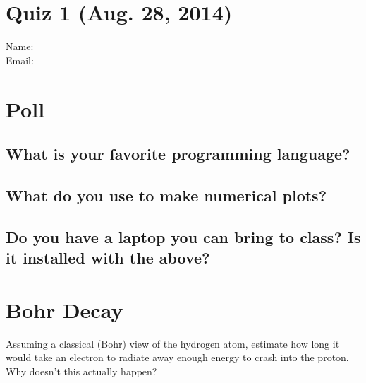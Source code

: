\documentclass[11pt]{article}
\begin{document}
\pagestyle{empty}
\parindent=0pt

\section*{\centering Quiz 1 (Aug. 28, 2014)}

{\large
Name:\\
Email:\\
}

\section{Poll}
\subsection{What is your favorite programming language?}
\vspace{0.25in}
\subsection{What do you use to make numerical plots?}
\vspace{0.25in}
\subsection{Do you have a laptop you can bring to class? Is it installed with the above?}
\vspace{0.25in}

\section{Bohr Decay}

Assuming a classical (Bohr) view of the hydrogen atom, estimate how long it would take
an electron to radiate away enough energy to crash into the proton.  Why doesn't this
actually happen?
\end{document}
